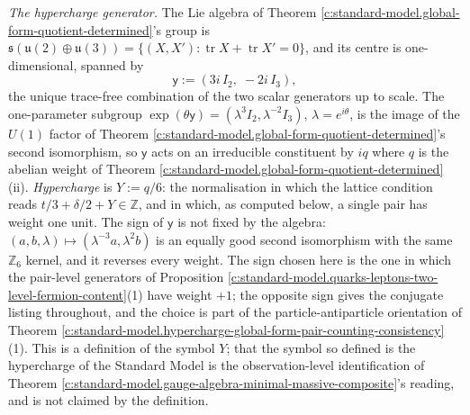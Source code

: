 \documentclass[11pt]{article}
\theoremstyle{definition}
\theoremstyle{plain}
\providecommand{\tr}{}\renewcommand{\tr}{\operatorname{tr}}
\providecommand{\uu}{}\renewcommand{\uu}{\mathfrak{u}}
\begin{document}
\emph{The hypercharge generator.} The Lie algebra of Theorem \ref{c:standard-model.global-form-quotient-determined}'s group is $\mathfrak{s}(\uu(2) \oplus \uu(3)) = \{(X, X') : \tr X + \tr X' = 0\}$, and its centre is one-dimensional, spanned by
\[
\mathsf{y} := (3i\,I_{2},\; -2i\,I_{3}),
\]
the unique trace-free combination of the two scalar generators up to scale. The one-parameter subgroup $\exp(\theta\mathsf{y}) = (\lambda^{3}I_{2}, \lambda^{-2}I_{3})$, $\lambda = e^{i\theta}$, is the image of the $U(1)$ factor of Theorem \ref{c:standard-model.global-form-quotient-determined}'s second isomorphism, so $\mathsf{y}$ acts on an irreducible constituent by $iq$ where $q$ is the abelian weight of Theorem \ref{c:standard-model.global-form-quotient-determined}(ii). \emph{Hypercharge} is $Y := q/6$: the normalisation in which the lattice condition reads $t/3 + \delta/2 + Y \in \mathbb{Z}$, and in which, as computed below, a single pair has weight one unit. The sign of $\mathsf{y}$ is not fixed by the algebra: $(a, b, \lambda) \mapsto (\lambda^{-3}a, \lambda^{2}b)$ is an equally good second isomorphism with the same $\mathbb{Z}_{6}$ kernel, and it reverses every weight. The sign chosen here is the one in which the pair-level generators of Proposition \ref{c:standard-model.quarks-leptons-two-level-fermion-content}(1) have weight $+1$; the opposite sign gives the conjugate listing throughout, and the choice is part of the particle-antiparticle orientation of Theorem \ref{c:standard-model.hypercharge-global-form-pair-counting-consistency}(1). This is a definition of the symbol $Y$; that the symbol so defined is the hypercharge of the Standard Model is the observation-level identification of Theorem \ref{c:standard-model.gauge-algebra-minimal-massive-composite}'s reading, and is not claimed by the definition.
\end{document}
